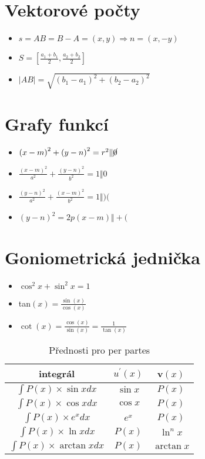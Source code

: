 \documentclass{article}
\providecommand{\tabularnewline}{\\}
\begin{document}
\begin{multicols}{2}
\section{Vektorové počty}
\begin{itemize}
    \item $s=AB=B-A=\left(x,y\right)\Longrightarrow n=\left(x,-y\right)$
    \item $S=\left[\frac{a_{1}+b_{1}}{2},\frac{a_{2}+b_{2}}{2}\right]$
    \item $\left|AB\right|=\sqrt{\left(b_{1}-a_{1}\right)^{2}+\left(b_{2}-a_{2}\right)^{2}}$
\end{itemize}
\section{Grafy funkcí}
\begin{itemize}
    \item $\left(x-m\right)^{2}+\left(y-n\right)^{2}=r^{2}\Vert\cancel{0}$
    \item $\frac{\left(x-m\right)^{2}}{a^{2}}+\frac{\left(y-n\right)^{2}}{b^{2}}=1\Vert0$
    \item $\frac{\left(y-n\right)^{2}}{a^{2}}+\frac{\left(x-m\right)^{2}}{b^{2}}=1\Vert)($
    \item $\left(y-n\right)^{2}=2p\left(x-m\right)\Vert+($
\end{itemize}
\section{Goniometrická jednička}
\begin{itemize}
    \item $\cos^{2}x+\sin^{2}x=1$
    \item tan$\left(x\right)=\frac{\sin\left(x\right)}{\cos\left(x\right)}$
    \item $\cot\left(x\right)=\frac{\cos\left(x\right)}{\sin\left(x\right)}=\frac{1}{\tan\left(x\right)}$
\end{itemize}
\end{multicols}
\begin{table}[h]
    \centering
    \begin{tabular}{|c|c|c|}
    \hline 
    integrál & $u^{\prime}\left(x\right)$ & v$\left(x\right)$\tabularnewline
    \hline 
    \hline 
    $\int P\left(x\right)\times\sin xdx$ & $\sin x$ & $P\left(x\right)$\tabularnewline
    \hline 
    $\int P\left(x\right)\times\cos xdx$ & $\cos x$ & $P\left(x\right)$\tabularnewline
    \hline 
    $\int P\left(x\right)\times e^{x}dx$ & $e^{x}$ & $P\left(x\right)$\tabularnewline
    \hline 
    $\int P\left(x\right)\times\ln xdx$ & $P\left(x\right)$ & $\ln^{n}x$\tabularnewline
    \hline 
    $\int P\left(x\right)\times\arctan xdx$ & $P\left(x\right)$ & $\arctan x$\tabularnewline
    \hline 
    \end{tabular}
    \caption{Přednosti pro per partes}
    \label{tab:perpartes}
\end{table}
\end{document}
